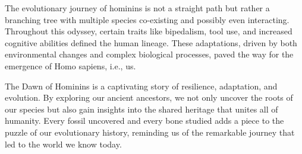 The evolutionary journey of hominins is not a straight path but rather a branching tree with multiple species co-existing and possibly even interacting. Throughout this odyssey, certain traits like bipedalism, tool use, and increased cognitive abilities defined the human lineage. These adaptations, driven by both environmental changes and complex biological processes, paved the way for the emergence of Homo sapiens, i.e., us.

The Dawn of Hominins is a captivating story of resilience, adaptation, and evolution. By exploring our ancient ancestors, we not only uncover the roots of our species but also gain insights into the shared heritage that unites all of humanity. Every fossil uncovered and every bone studied adds a piece to the puzzle of our evolutionary history, reminding us of the remarkable journey that led to the world we know today.
